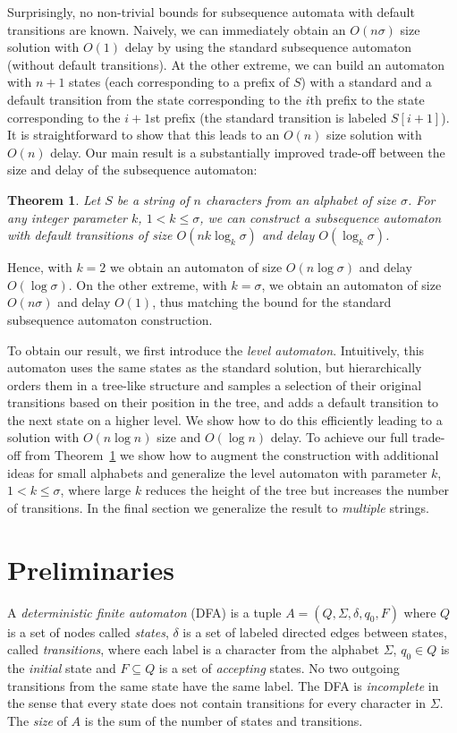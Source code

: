 \documentclass[a4paper,11pt]{article}
\newtheorem{theorem}{Theorem}
\begin{document}
Surprisingly, no non-trivial bounds for subsequence automata with default transitions are known. Naively\label{lab:naive-single}, we can immediately obtain an $O(n\sigma)$ size solution with $O(1)$ delay by using the standard subsequence automaton (without default transitions). At the other extreme, we can build an automaton with $n+1$ states (each corresponding to a prefix of $S$) with a standard and a default transition from the state corresponding to the $i$th prefix to the state corresponding to the $i+1$st prefix (the standard transition is labeled $S[i+1]$). It is straightforward to show that this leads to an $O(n)$ size solution with $O(n)$ delay. Our main result is a substantially improved trade-off between the size and delay of the subsequence automaton:

\begin{theorem}
\label{thm:main}
Let $S$ be a string of $n$ characters from an alphabet of size $\sigma$. For any integer parameter $k$, $1 < k \leq \sigma$, we can construct a subsequence automaton with default transitions of size $O(nk\log_k\sigma)$ and delay $O(\log_k \sigma)$.
\end{theorem}

Hence, with $k = 2$ we obtain an automaton of size $O(n \log \sigma)$ and delay $O(\log \sigma)$. On the other extreme, with $k = \sigma$, we obtain an automaton of size $O(n \sigma)$ and delay $O(1)$, thus matching the bound for the standard subsequence automaton construction. 

To obtain our result, we first introduce the \emph{level automaton}. Intuitively, this automaton uses the same states as the standard solution, but hierarchically orders them in a tree-like structure and samples a selection of their original transitions based on their position in the tree, and adds a default transition to the next state on a higher level. We show how to do this efficiently leading to a solution with $O(n \log n)$ size and $O(\log n)$ delay. To achieve our full trade-off from Theorem~\ref{thm:main} we show how to augment the construction with additional ideas for small alphabets and generalize the level automaton with parameter $k$, $1 < k \leq \sigma$, where large $k$ reduces the height of the tree but increases the number of transitions. In the final section we generalize the result to \emph{multiple} strings.

\section{Preliminaries}
A \emph{deterministic finite automaton} (DFA) is a tuple $A = (Q, \Sigma, \delta,  q_0, F)$ where $Q$ is a set of nodes called \emph{states}, $\delta$ is a set of labeled directed edges between states, called \emph{transitions}, where each label is a character from the alphabet $\Sigma$, $q_0\in Q$ is the \emph{initial} state and $F\subseteq Q$ is a set of \emph{accepting} states. No two outgoing transitions from the same state have the same label. The DFA is \emph{incomplete} in the sense that every state does not contain transitions for every character in $\Sigma$.
 The \emph{size} of $A$ is the sum of the number of states and transitions.
\end{document}
